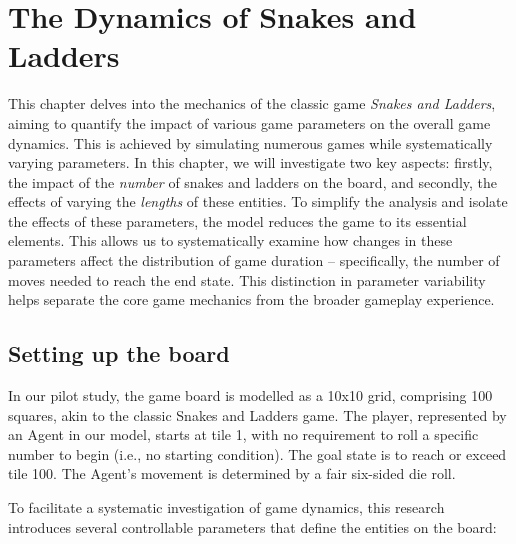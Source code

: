 \documentclass[12pt]{report}
\begin{document}
	\chapter{The Dynamics of Snakes and Ladders}
	This chapter delves into the mechanics of the classic game \textit{Snakes and Ladders}, aiming to quantify the impact of various game parameters on the overall game dynamics. This is achieved by simulating numerous games while systematically varying parameters. In this chapter, we will investigate two key aspects: firstly, the impact of the \textit{number} of snakes and ladders on the board, and secondly, the effects of varying the \textit{lengths} of these entities. To simplify the analysis and isolate the effects of these parameters, the model reduces the game to its essential elements. This allows us to systematically examine how changes in these parameters affect the distribution of game duration – specifically, the number of moves needed to reach the end state. This distinction in parameter variability helps separate the core game mechanics from the broader gameplay experience.
	
	\section{Setting up the board}
	
	In our pilot study, the game board is modelled as a 10x10 grid, comprising 100 squares, akin to the classic Snakes and Ladders game. The player, represented by an Agent in our model, starts at tile 1, with no requirement to roll a specific number to begin (i.e., no starting condition). The goal state is to reach or exceed tile 100. The Agent's movement is determined by a fair six-sided die roll.
	
	To facilitate a systematic investigation of game dynamics, this research introduces several controllable parameters that define the entities on the board:
	
\end{document}
